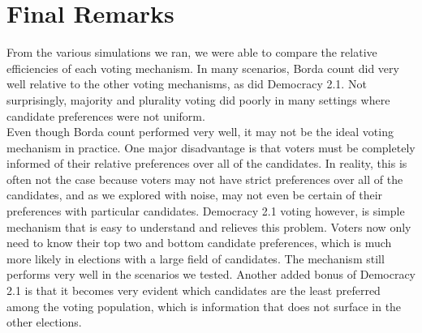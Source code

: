 \documentclass[11pt]{scrartcl}
\begin{document}
\section{Final Remarks}

From the various simulations we ran, we were able to compare the relative efficiencies of each voting mechanism. In many scenarios, Borda count did very well relative to the other voting mechanisms, as did Democracy 2.1. Not surprisingly, majority and plurality voting did poorly in many settings where candidate preferences were not uniform.\\

Even though Borda count performed very well, it may not be the ideal voting mechanism in practice. One major disadvantage is that voters must be completely informed of their relative preferences over all of the candidates. In reality, this is often not the case because voters may not have strict preferences over all of the candidates, and as we explored with noise, may not even be certain of their preferences with particular candidates. Democracy 2.1 voting however, is simple mechanism that is easy to understand and relieves this problem. Voters now only need to know their top two and bottom candidate preferences, which is much more likely in elections with a large field of candidates. The mechanism still performs very well in the scenarios we tested. Another added bonus of Democracy 2.1 is that it becomes very evident which candidates are the least preferred among the voting population, which is information that does not surface in the other elections. 
\end{document}
